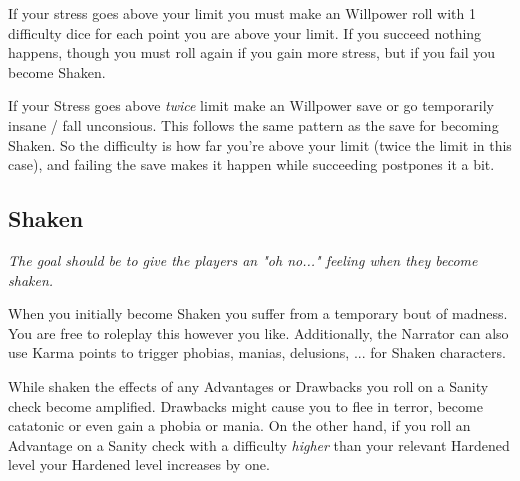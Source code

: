If your stress goes above your limit you must make an Willpower roll with 1 difficulty dice for each point you are above your limit.
If you succeed nothing happens, though you must roll again if you gain more stress,
but if you fail you become Shaken.

If your Stress goes above \textit{twice} limit make an Willpower save or go temporarily insane / fall unconsious.
This follows the same pattern as the save for becoming Shaken. So the difficulty is how far you're above your limit (twice the limit in this case), and failing the save makes it happen while succeeding postpones it a bit.


\subsection{Shaken}
\textit{The goal should be to give the players an "oh no..." feeling when they become shaken.}

When you initially become Shaken you suffer from a temporary bout of madness. 
You are free to roleplay this however you like. 
Additionally, the Narrator can also use Karma points to trigger 
phobias, manias, delusions, ... for Shaken characters.


While shaken the effects of any Advantages or Drawbacks you roll on a Sanity check become amplified.
Drawbacks might cause you to flee in terror, become catatonic or even gain a phobia or mania.
On the other hand, if you roll an Advantage on a Sanity check with a difficulty \textit{higher}
than your relevant Hardened level your Hardened level increases by one.




